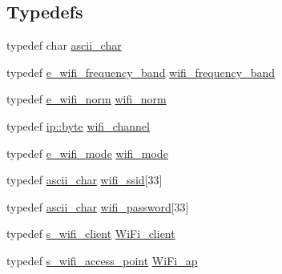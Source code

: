 \subsection*{Typedefs}
\begin{DoxyCompactItemize}
\item 
typedef char \mbox{\hyperlink{namespacewood_box_1_1communication_1_1wifi_a29995934e86031637bb2e0d8192cc467}{ascii\+\_\+char}}
\item 
typedef \mbox{\hyperlink{namespacewood_box_1_1communication_1_1wifi_af013313f9ec21bfe5a151b90972bcfad}{e\+\_\+wifi\+\_\+frequency\+\_\+band}} \mbox{\hyperlink{namespacewood_box_1_1communication_1_1wifi_ab6ec32b2704f0e2cd124c2e64115d355}{wifi\+\_\+frequency\+\_\+band}}
\item 
typedef \mbox{\hyperlink{namespacewood_box_1_1communication_1_1wifi_ad8134bb3fde72db09c3ba7071ed46a24}{e\+\_\+wifi\+\_\+norm}} \mbox{\hyperlink{namespacewood_box_1_1communication_1_1wifi_ad4c2c5935a896a0062be3098e7aa8cd7}{wifi\+\_\+norm}}
\item 
typedef \mbox{\hyperlink{namespacewood_box_1_1communication_1_1ip_af1b00b9755ebc1bbeb6b5be2068bb421}{ip\+::byte}} \mbox{\hyperlink{namespacewood_box_1_1communication_1_1wifi_a9e6c3404835d9868a9bf5eb76f50fec2}{wifi\+\_\+channel}}
\item 
typedef \mbox{\hyperlink{namespacewood_box_1_1communication_1_1wifi_a5ad80eaf01cc029d013169340f00267f}{e\+\_\+wifi\+\_\+mode}} \mbox{\hyperlink{namespacewood_box_1_1communication_1_1wifi_a3e9d11687e2f4486b2835c8de42fb875}{wifi\+\_\+mode}}
\item 
typedef \mbox{\hyperlink{namespacewood_box_1_1communication_1_1wifi_a29995934e86031637bb2e0d8192cc467}{ascii\+\_\+char}} \mbox{\hyperlink{namespacewood_box_1_1communication_1_1wifi_a6e704a61f3a7acac7425400dff34d68f}{wifi\+\_\+ssid}}\mbox{[}33\mbox{]}
\item 
typedef \mbox{\hyperlink{namespacewood_box_1_1communication_1_1wifi_a29995934e86031637bb2e0d8192cc467}{ascii\+\_\+char}} \mbox{\hyperlink{namespacewood_box_1_1communication_1_1wifi_abb74f42637926c2c61a05dafc57a7ab8}{wifi\+\_\+password}}\mbox{[}33\mbox{]}
\item 
typedef \mbox{\hyperlink{structwood_box_1_1communication_1_1wifi_1_1s__wifi__client}{s\+\_\+wifi\+\_\+client}} \mbox{\hyperlink{namespacewood_box_1_1communication_1_1wifi_a4c55d803e5a5ade83a2e148ec3695bd2}{Wi\+Fi\+\_\+client}}
\item 
typedef \mbox{\hyperlink{structwood_box_1_1communication_1_1wifi_1_1s__wifi__access__point}{s\+\_\+wifi\+\_\+access\+\_\+point}} \mbox{\hyperlink{namespacewood_box_1_1communication_1_1wifi_ab28c5c66d6e5d8b41938d2494a633134}{Wi\+Fi\+\_\+ap}}
\end{DoxyCompactItemize}
